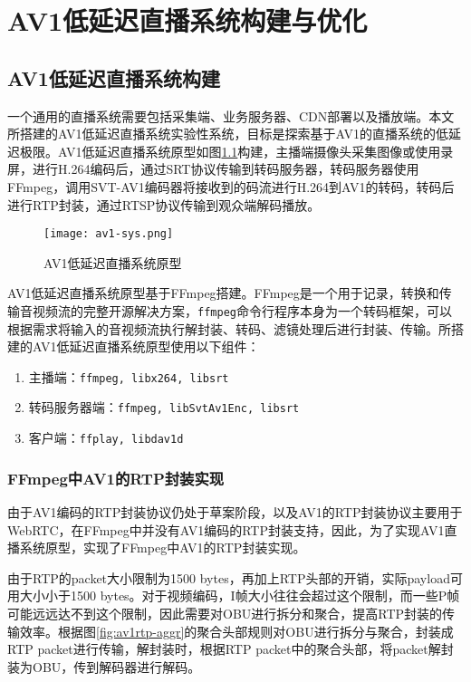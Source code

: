 \chapter{AV1低延迟直播系统构建与优化}

\section{AV1低延迟直播系统构建}
	一个通用的直播系统需要包括采集端、业务服务器、CDN部署以及播放端。本文所搭建的AV1低延迟直播系统实验性系统，目标是探索基于AV1的直播系统的低延迟极限。AV1低延迟直播系统原型如图\ref{fig:av1-sys}构建，主播端摄像头采集图像或使用录屏，进行H.264编码后，通过SRT协议传输到转码服务器，转码服务器使用FFmpeg，调用SVT-AV1编码器将接收到的码流进行H.264到AV1的转码，转码后进行RTP封装，通过RTSP协议传输到观众端解码播放。

  \begin{figure}[!htp]
    \centering
    \texttt{[image: av1-sys.png]}
    \caption{AV1低延迟直播系统原型}
   \label{fig:av1-sys}
  \end{figure}

  AV1低延迟直播系统原型基于FFmpeg搭建。FFmpeg是一个用于记录，转换和传输音视频流的完整开源解决方案，\texttt{ffmpeg}命令行程序本身为一个转码框架，可以根据需求将输入的音视频流执行解封装、转码、滤镜处理后进行封装、传输。所搭建的AV1低延迟直播系统原型使用以下组件：
	\begin{enumerate} [label=\arabic*)]
		\item 主播端：\texttt{ffmpeg, libx264, libsrt}
		\item 转码服务器端：\texttt{ffmpeg, libSvtAv1Enc, libsrt}
		\item 客户端：\texttt{ffplay, libdav1d}
	\end{enumerate}
\subsection{FFmpeg中AV1的RTP封装实现}
	由于AV1编码的RTP封装协议\cite{RTPPayloadFormat}仍处于草案阶段，以及AV1的RTP封装协议主要用于WebRTC，在FFmpeg中并没有AV1编码的RTP封装支持，因此，为了实现AV1直播系统原型，实现了FFmpeg中AV1的RTP封装实现。
	
	由于RTP的packet大小限制为1500 bytes，再加上RTP头部的开销，实际payload可用大小小于1500 bytes。对于视频编码，I帧大小往往会超过这个限制，而一些P帧可能远远达不到这个限制，因此需要对OBU进行拆分和聚合，提高RTP封装的传输效率。根据图\ref{fig:av1rtp-aggr}的聚合头部规则对OBU进行拆分与聚合，封装成RTP packet进行传输，解封装时，根据RTP packet中的聚合头部，将packet解封装为OBU，传到解码器进行解码。
	
